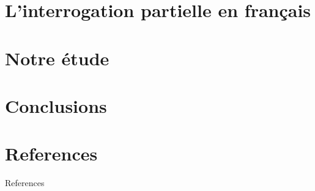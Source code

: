 \documentclass[aspectratio=169, sectionpages, codemintedoverleaf, bibref]{beamer}
\begin{document}
\section{L'interrogation partielle en français}




\section{Notre étude}





\section{Conclusions}


\section{References}

\begin{frame}[allowframebreaks]{References}
	\printbibliography[title={References}]%
\end{frame}
\end{document}
